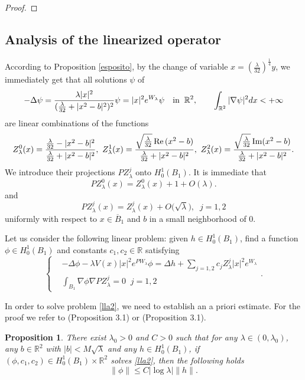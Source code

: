 \documentclass[reqno,11pt]{amsart}
\newtheorem{prop}[thm]{Proposition}
\theoremstyle{definition}
\numberwithin{equation}{section}
\newcommand{\rr}{\mathbb{R}}
\newcommand{\intr}{\int_{\R^2}}
\newcommand{\R}{\mathbb{R}}
\newcommand{\la}{\lambda}
\newcommand{\into}{\int_{B_1}}
\renewcommand{\(}{\left(}
\renewcommand{\)}{\right)}
\renewcommand{\[}{\left[}
\renewcommand{\]}{\right]}
\def\Re{{\rm Re}\,}
\def\Im{{\rm Im}}
\begin{document}
{\begin{proof}
\end{proof}



\subsection{{\large{Analysis of the linearized operator}}}
According to Proposition \ref{esposito}, by the change of variable $x=(\frac{\la}{32})^{\frac14} y$, we immediately get that  all solutions $\psi $  of
$$
-\Delta \psi= {\la|x|^{2}\over (\frac{\la}{32}+|x^{2 }-b|^2)^2}\psi =|x|^{2} e^{W_\la}\psi\quad \hbox{in}\;\; \rr^2,\qquad \intr |\nabla \psi|^2 dx<+\infty$$
are linear combinations of the functions
$$Z^0_{\la}(x)={\frac{\la}{32}-|x^{2}-b|^2\over \frac{\la}{32}+|x^{2 }-b|^2},\ Z^1_{\la}(x)=
{ \sqrt{\frac{\la}{32}}\,\Re(x^{2 }-b)\over  \frac{\la}{32}+|x^{2 }-b|^2},\ Z^2_{\la}(x)=
{ \sqrt{\frac{\la}{32}} \,\Im(x^{2 }-b)\over  \frac{\la}{32}+|x^{2 }-b|^2}
.$$
We introduce their projections $PZ^j_{\la}$ onto $H^1_0(B_1).$ It is immediate that
 \begin{equation}\label{pz0}
PZ^0_{\la}(x)=Z^0_{\la}(x)+1+ O(\la).
\end{equation}
 and
  \begin{equation}\label{pzi}
PZ^j_{\la}(x)=Z^j _{\la}(x) + O\big(\sqrt{\la}\big),\;\; j=1,2
\end{equation}
uniformly with respect to $x\in\overline B_1$ and $b$ in a small neighborhood of $0$.



Let us consider the following linear problem: given
$ h\in H_0^1(B_1)$,  find a function $\phi\in  H^1_0(B_1)$ and constants $c_1,c_2\in\R$ satisfying
\begin{equation}\label{lla2}
\left\{\begin{aligned}&-\Delta \phi   -\la V(x)|x|^{2} e^{P{W}_\la}\phi=\Delta h+\sum_{j=1,2}c_j Z^j_{\la} |x|^{2}e^{W_{\la}}\\ &\into \nabla \phi\nabla PZ_\la^j=0\;\;j=1,2\end{aligned}\right..
\end{equation}

In order to solve problem \eqref{lla2}, we need to establish an a priori estimate. For the proof we refer to \cite{delkomu} (Proposition 3.1) or \cite{espogropi} (Proposition 3.1). 

\begin{prop}\label{inv} 
There exist $\lambda_0>0$ and $C>0$ such that for any $\la \in(0, \la_0)$, any $b\in \R^2$ with $|b|<M\sqrt\la$ and   any $h\in  H^1_0(B_1)$, if  
$(\phi,c_1,c_2)\in  H^1_0(B_1)\times \R^2$  solves  \eqref{lla2}, then the following holds $$\|\phi\|    \leq C  |\log\la |    \|h\| .$$
\end{prop}

}
\end{document}

